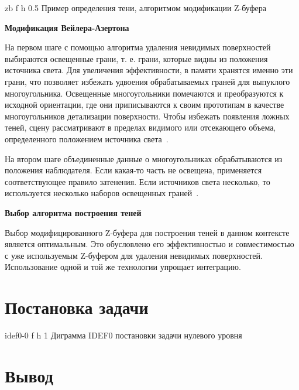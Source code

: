 	{zb} %
	{f} %
	{h} %
	{0.5\textwidth} %
	{Пример определения тени, алгоритмом модификации Z-буфера} %


\textbf{Модификация Вейлера-Азертона}

На первом шаге с помощью алгоритма удаления невидимых поверхностей выбираются освещенные грани, т. е. грани, которые видны из положения источника света.
Для увеличения эффективности, в памяти хранятся именно эти грани, что позволяет избежать удвоения обрабатываемых граней для выпуклого многоугольника.
Освещенные многоугольники помечаются и преобразуются к исходной ориентации, где они приписываются к своим прототипам в качестве многоугольников детализации поверхности.
Чтобы избежать появления ложных теней, сцену рассматривают в пределах видимого или отсекающего объема, определенного положением источника света~\cite{letion}.

На втором шаге объединенные данные о многоугольниках обрабатываются из положения наблюдателя. Если какая-то часть не освещена, применяется соответствующее правило затенения.
Если источников света несколько, то используется несколько наборов освещенных граней~\cite{letion}.

\textbf{Выбор алгоритма построения теней}

Выбор модифицированного Z-буфера для построения теней в данном контексте является оптимальным. Это обусловлено его эффективностью и совместимостью с уже используемым Z-буфером для удаления невидимых поверхностей.
Использование одной и той же технологии упрощает интеграцию.

\section{Постановка задачи}

	{idef0-0} %
	{f} %
	{h} %
	{1\textwidth} %
	{Диграмма IDEF0 постановки задачи нулевого уровня} %

	
\section*{Вывод}


